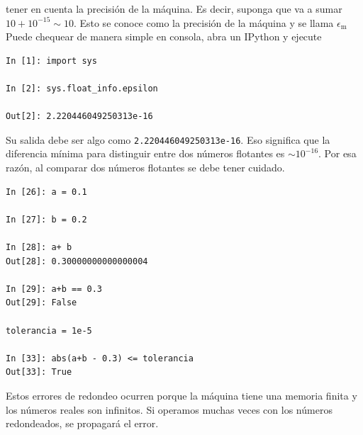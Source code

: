\documentclass[12pt]{article}
\begin{document}
tener en cuenta la precisión de la máquina. Es decir, suponga que va a sumar 
$10 +10^{-15}\sim 10$. Esto se conoce como la precisión de la máquina y se llama $\epsilon_{\text{m}}$
Puede chequear de manera simple en consola, abra un IPython y ejecute
\begin{lstlisting}
In [1]: import sys

In [2]: sys.float_info.epsilon

Out[2]: 2.220446049250313e-16
\end{lstlisting}
Su salida debe ser algo como \lstinline|2.220446049250313e-16|. Eso significa que la diferencia mínima
para distinguir entre dos números flotantes es $\sim 10^{-16}$. Por esa razón, al comparar 
dos números flotantes se debe tener cuidado. 
\begin{lstlisting}
In [26]: a = 0.1

In [27]: b = 0.2

In [28]: a+ b
Out[28]: 0.30000000000000004

In [29]: a+b == 0.3
Out[29]: False

tolerancia = 1e-5

In [33]: abs(a+b - 0.3) <= tolerancia
Out[33]: True
\end{lstlisting}
Estos errores de redondeo ocurren porque la máquina tiene una memoria finita y los números 
reales son infinitos. Si operamos muchas veces con los números redondeados, se propagará el 
error.
\end{document}
